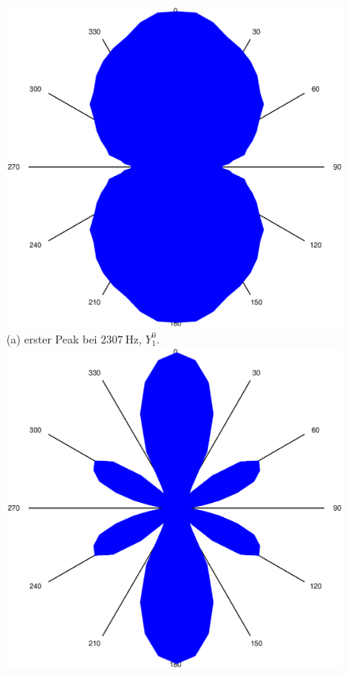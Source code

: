 \begin{figure}
\centering
\begin{minipage}{0.45\textwidth}
\centering
\includegraphics[width=\linewidth,keepaspectratio]{FP-V23data/2.3_2306.535Hz.eps}
%
(a) erster Peak bei $\SI{2307}{\hertz}$, $Y_1^0$.
\includegraphics[width=\linewidth,keepaspectratio]{FP-V23data/2.3_4985.394Hz.eps}

\end{minipage}
\end{figure}

